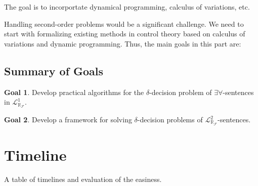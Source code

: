 \documentclass[10pt]{article}
\newcommand{\lrf}{\mathcal{L}_{\mathbb{R}_{\mathcal{F}}}}
\theoremstyle{definition}
\newtheorem{goal}{Goal}
\begin{document}
The goal is to incorportate dynamical programming, calculus of variations, etc. 


Handling second-order problems would be a significant challenge. We need to start with formalizing existing methods in control theory based on calculus of variations and dynamic programming. Thus, the main goals in this part are:


\subsection{Summary of Goals}

\begin{goal}
Develop practical algorithms for the $\delta$-decision problem of $\exists\forall$-sentences in $\lrf^1$.
\end{goal}
\begin{goal}
Develop a framework for solving $\delta$-decision problems of $\lrf^2$-sentences.
\end{goal}




\section{Timeline}

A table of timelines and evaluation of the easiness. 














\end{document}

